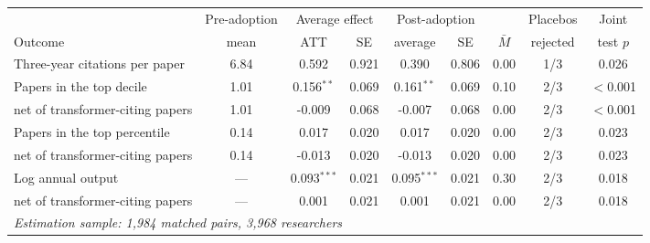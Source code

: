 \begin{tabular}{lcccccccc}
\toprule
 & Pre-adoption & \multicolumn{2}{c}{Average effect} & \multicolumn{2}{c}{Post-adoption} & & Placebos & Joint \\
Outcome & mean & ATT & SE & average & SE & $\bar{M}$ & rejected & test $p$ \\
\midrule
Three-year citations per paper & 6.84 & 0.592 & 0.921 & 0.390 & 0.806 & 0.00 & 1/3 & 0.026 \\
Papers in the top decile & 1.01 & 0.156$^{**}$ & 0.069 & 0.161$^{**}$ & 0.069 & 0.10 & 2/3 & $<$0.001 \\
\;\;net of transformer-citing papers & 1.01 & -0.009 & 0.068 & -0.007 & 0.068 & 0.00 & 2/3 & $<$0.001 \\
Papers in the top percentile & 0.14 & 0.017 & 0.020 & 0.017 & 0.020 & 0.00 & 2/3 & 0.023 \\
\;\;net of transformer-citing papers & 0.14 & -0.013 & 0.020 & -0.013 & 0.020 & 0.00 & 2/3 & 0.023 \\
Log annual output & --- & 0.093$^{***}$ & 0.021 & 0.095$^{***}$ & 0.021 & 0.30 & 2/3 & 0.018 \\
\;\;net of transformer-citing papers & --- & 0.001 & 0.021 & 0.001 & 0.021 & 0.00 & 2/3 & 0.018 \\
\midrule
\multicolumn{9}{l}{\emph{Estimation sample: 1,984 matched pairs, 3,968 researchers}} \\
\bottomrule
\end{tabular}
